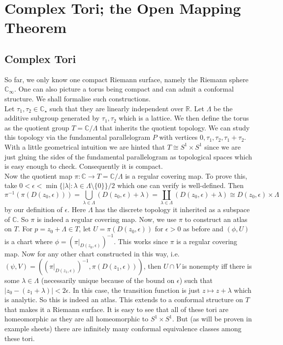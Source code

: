 \section{Complex Tori; the Open Mapping Theorem}
\subsection{Complex Tori}
So far, we only know one compact Riemann surface, namely the Riemann sphere $\mathbb C_\infty$.
One can also picture a torus being compact and can admit a conformal structure.
We shall formalise such constructions.\\
Let $\tau_1,\tau_2\in\mathbb C_\star$ such that they are linearly independent over $\mathbb R$.
Let $\Lambda$ be the additive subgroup generated by $\tau_1,\tau_2$ which is a lattice.
We then define the torus as the quotient group $T=\mathbb C/\Lambda$ that inherits the quotient topology.
We can study this topology via the fundamental parallelogram $P$ with vertices $0,\tau_1,\tau_2,\tau_1+\tau_2$.
With a little geometrical intuition we are hinted that $T\cong S^1\times S^1$ since we are just gluing the sides of the fundamental parallelogram as topological spaces which is easy enough to check.
Consequently it is compact.\\
Now the quotient map $\pi:\mathbb C\to T=\mathbb C/\Lambda$ is a regular covering map.
To prove this, take $0<\epsilon<\min\{|\lambda|:\lambda\in\Lambda\setminus\{0\}\}/2$ which one can verify is well-defined.
Then
$$\pi^{-1}(\pi(D(z_0,\epsilon)))=\bigcup_{\lambda\in\Lambda}(D(z_0,\epsilon)+\lambda)=\coprod_{\lambda\in\Lambda}(D(z_0,\epsilon)+\lambda)\cong D(z_0,\epsilon)\times\Lambda$$
by our definition of $\epsilon$.
Here $\Lambda$ has the discrete topology it inherited as a subspace of $\mathbb C$.
So $\pi$ is indeed a regular covering map.
Now, we use $\pi$ to construct an atlas on $T$.
For $p=z_0+\Lambda\in T$, let $U=\pi(D(z_0,\epsilon))$ for $\epsilon>0$ as before and $(\phi,U)$ is a chart where $\phi=(\pi|_{D(z_0,\epsilon)})^{-1}$.
This works since $\pi$ is a regular covering map.
Now for any other chart constructed in this way, i.e. $(\psi,V)=((\pi|_{D(z_1,\epsilon)})^{-1},\pi(D(z_1,\epsilon)))$, then $U\cap V$ is nonempty iff there is some $\lambda\in\Lambda$ (necessarily unique because of the bound on $\epsilon$) such that $|z_0-(z_1+\lambda)|<2\epsilon$.
In this case, the transition function is just $z\mapsto z+\lambda$ which is analytic.
So this is indeed an atlas.
This extends to a conformal structure on $T$ that makes it a Riemann surface.
It is easy to see that all of these tori are homeomorphic as they are all homeomorphic to $S^1\times S^1$.
But (as will be proven in example sheets) there are infinitely many conformal equivalence classes among these tori.
